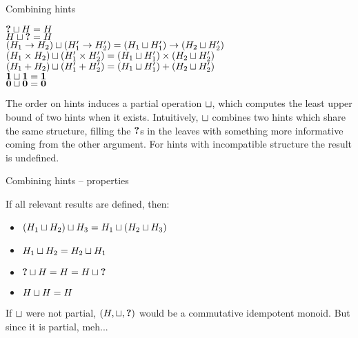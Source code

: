 \documentclass{beamer}
\begin{document}
\begin{frame}{Combining hints}

\begin{center}
  $\textbf{?} \sqcup H = H$ \\
  $H \sqcup \textbf{?} = H$ \\
  $(H_1 \to H_2) \sqcup (H'_1 \to H'_2) = (H_1 \sqcup H'_1) \to (H_2 \sqcup H'_2)$ \\
  $(H_1 \times H_2) \sqcup (H'_1 \times H'_2) = (H_1 \sqcup H'_1) \times (H_2 \sqcup H'_2)$ \\
  $(H_1 + H_2) \sqcup (H'_1 + H'_2) = (H_1 \sqcup H'_1) + (H_2 \sqcup H'_2)$ \\
  $\textbf{1} \sqcup \textbf{1} = \textbf{1}$ \\
  $\textbf{0} \sqcup \textbf{0} = \textbf{0}$
\end{center}

The order on hints induces a partial operation $\sqcup$, which computes the least upper bound of two hints when it exists. Intuitively, $\sqcup$ combines two hints which share the same structure, filling the $\textbf{?}$s in the leaves with something more informative coming from the other argument. For hints with incompatible structure the result is undefined.

\end{frame}

\begin{frame}{Combining hints -- properties}

If all relevant results are defined, then:

\begin{itemize}
  \item $(H_1 \sqcup H_2) \sqcup H_3 = H_1 \sqcup (H_2 \sqcup H_3)$
  \item $H_1 \sqcup H_2 = H_2 \sqcup H_1$
  \item $\textbf{?} \sqcup H = H = H \sqcup \textbf{?}$
  \item $H \sqcup H = H$
\end{itemize}

\vspace{2em}

If $\sqcup$ were not partial, $(H, \sqcup, \textbf{?})$ would be a commutative idempotent monoid. But since it is partial, meh...

\end{frame}
\end{document}
